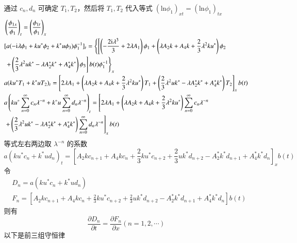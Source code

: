 通过 $c_{n}, d_{n}$ 可确定 $T_{1}, T_{2}$，然后将 $T_{1}, T_{2}$ 代入等式 $(\mathrm{ln} \phi_{1})_{xt} = (\mathrm{ln} \phi_{1})_{tx}$
\begin{align}
  & \left(\frac{\phi_{1x}}{\phi_{1}}\right)_{t} = \left(\frac{\phi_{1t}}{\phi_{1}}\right)_{x} \\
  & [a(-\mathrm{i}\lambda\phi_{1} + ku^{*}\phi_{2} +k^{*}u\phi_{3})\phi_{1}^{-1}]_{t} = \left\{\left[\left(-\frac{2\mathrm{i}\lambda^{3}}{3}+2\lambda A_{1}\right)\phi_{1} + \left(\lambda A_{2}k+A_{4}k+\frac{2}{3}\lambda^{2}ku^{*}\right)\phi_{2} \right.\right. \notag\\
  & \left.\left. + \left(\frac{2}{3}\lambda^{2}uk^{*}-\lambda A_{2}^{*}k^{*}+A_{4}^{*}k^{*}\right)\phi_{3}\right]b(t)\phi_{1}^{-1}\right\}_{x} \\
  & a(ku^{*}T_{1} + k^{*}uT_{2})_{t} = \left[2\lambda A_{1} + \left(\lambda A_{2}k+A_{4}k+\frac{2}{3}\lambda^{2}ku^{*}\right)T_{1} + \left(\frac{2}{3}\lambda^{2}uk^{*}-\lambda A_{2}^{*}k^{*}+A_{4}^{*}k^{*}\right)T_{2}\right]_{x}b(t) \\
  & a\left(ku^{*}\sum_{n=0}^{\infty}c_{n}\lambda^{-n} + k^{*}u\sum_{n=0}^{\infty}d_{n}\lambda^{-n}\right)_{t} = \left[2\lambda A_{1} + \left(\lambda A_{2}k+A_{4}k+\frac{2}{3}\lambda^{2}ku^{*}\right)\sum_{n=0}^{\infty}c_{n}\lambda^{-n} \right. \notag\\
  & \left. + \left(\frac{2}{3}\lambda^{2}uk^{*}-\lambda A_{2}^{*}k^{*}+A_{4}^{*}k^{*}\right)\sum_{n=0}^{\infty}d_{n}\lambda^{-n}\right]_{x}b(t)
\end{align}
等式左右两边取 $\lambda^{-n}$ 的系数
\begin{equation}
  a(ku^{*}c_{n} + k^{*}ud_{n})_{t} = \left[A_{2}kc_{n+1} + A_{4}kc_{n} + \frac{2}{3}ku^{*}c_{n+2} + \frac{2}{3}uk^{*}d_{n+2} - A_{2}^{*}k^{*}d_{n+1} + A_{4}^{*}k^{*}d_{n}\right]_{x}b(t)
\end{equation}
令
\begin{align}
  & D_{n} = a(ku^{*}c_{n} + k^{*}ud_{n}) \\
  & F_{n} = \left[A_{2}kc_{n+1} + A_{4}kc_{n} + \frac{2}{3}ku^{*}c_{n+2} + \frac{2}{3}uk^{*}d_{n+2} - A_{2}^{*}k^{*}d_{n+1} + A_{4}^{*}k^{*}d_{n}\right]b(t)
\end{align}
则有
\begin{equation}
  \frac{\partial D_{n}}{\partial t} = \frac{\partial F_{n}}{\partial x} (n = 1, 2, \cdots)
\end{equation}
以下是前三组守恒律
